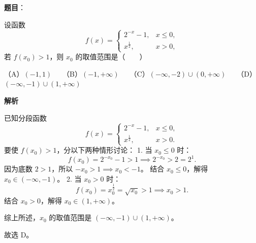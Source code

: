 \begin{answer}

\textbf{题目}：

设函数
\nopagebreak[4]
\[f(x) = \begin{cases} 2^{-x} - 1, & x \le 0, \\ x^{\frac{1}{2}}, & x > 0, \end{cases}\]
若 $f(x_0) > 1$，则 $x_0$ 的取值范围是\mbox{（　　）}

（A）$(-1, 1)$　　（B）$(-1, +\infty)$　　（C）$(-\infty, -2) \cup (0, +\infty)$　　（D）$(-\infty, -1) \cup (1, +\infty)$

\textbf{解析}

已知分段函数
\nopagebreak[4]
\[f(x) = \begin{cases} 2^{-x} - 1, & x \le 0, \\ x^{\frac{1}{2}}, & x > 0. \end{cases}\]
要使 $f(x_0) > 1$，分以下两种情形讨论：
1. 当 $x_0 \le 0$ 时：
\nopagebreak[4]
\[f(x_0) = 2^{-x_0} - 1 > 1 \implies 2^{-x_0} > 2 = 2^1.\]
   因为底数 $2 > 1$，所以 $-x_0 > 1 \implies x_0 < -1$。
   结合 $x_0 \le 0$，解得 $x_0 \in (-\infty, -1)$。
2. 当 $x_0 > 0$ 时：
\nopagebreak[4]
\[f(x_0) = x_0^{\frac{1}{2}} = \sqrt{x_0} > 1 \implies x_0 > 1.\]
   结合 $x_0 > 0$，解得 $x_0 \in (1, +\infty)$。

综上所述，$x_0$ 的取值范围是 $(-\infty, -1) \cup (1, +\infty)$。

故选 D。


\end{answer}
